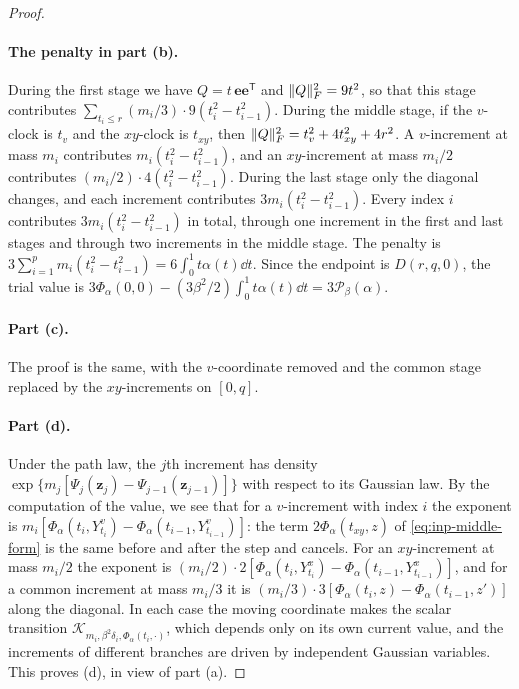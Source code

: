 \begin{proof}
\paragraph{The penalty in part (b).} During the first stage we have $Q=t\,\mathbf e\mathbf
e^{\mathsf T}$ and $\lVert Q\rVert_F^2=9t^2$, so that this stage contributes
$\sum_{t_i\le r}(m_i/3)\cdot9(t_i^2-t_{i-1}^2)$. During the middle stage, if
the $v$-clock is $t_v$ and the $xy$-clock is $t_{xy}$, then $\lVert Q\rVert_F^2=t_v^2+4t_{xy}^2+4r^2$.
A $v$-increment at mass $m_i$ contributes $m_i(t_i^2-t_{i-1}^2)$, and an
$xy$-increment at mass $m_i/2$ contributes $(m_i/2)\cdot4(t_i^2-t_{i-1}^2)$.
During the last stage only the diagonal changes, and each increment contributes
$3m_i(t_i^2-t_{i-1}^2)$. Every index $i$ contributes
$3m_i(t_i^2-t_{i-1}^2)$ in total, through one increment in the first and last
stages and through two increments in the middle stage. The penalty is
$3\sum_{i=1}^pm_i(t_i^2-t_{i-1}^2)=6\int_0^1t\alpha(t)\dd t$. Since the endpoint
is $D(r,q,0)$, the trial value is
$3\Phi_\alpha(0,0)-(3\beta^2/2)\int_0^1t\alpha(t)\dd t=3\mathcal P_\beta(\alpha)$.

\paragraph{Part (c).} The proof is the same, with the $v$-coordinate removed and
the common stage replaced by the $xy$-increments on $[0,q]$.

\paragraph{Part (d).} Under the path law, the $j$th increment has density
$\exp\{m_j[\Psi_j(\mathbf z_j)-\Psi_{j-1}(\mathbf z_{j-1})]\}$ with respect to its
Gaussian law. By the computation of the value, we see that for a $v$-increment with
index $i$ the exponent is $m_i[\Phi_\alpha(t_i,Y^v_{t_i})-\Phi_\alpha(t_{i-1},Y^v_{t_{i-1}})]$:
the term $2\Phi_\alpha(t_{xy},z)$ of \eqref{eq:inp-middle-form} is the same before and
after the step and cancels. For an $xy$-increment at mass $m_i/2$ the exponent is
$(m_i/2)\cdot2[\Phi_\alpha(t_i,Y^x_{t_i})-\Phi_\alpha(t_{i-1},Y^x_{t_{i-1}})]$,
and for a common increment at mass $m_i/3$ it is
$(m_i/3)\cdot3[\Phi_\alpha(t_i,z)-\Phi_\alpha(t_{i-1},z')]$ along the diagonal.
In each case the moving coordinate makes the scalar transition
$\mathcal K_{m_i,\beta^2\delta_i,\Phi_\alpha(t_i,\cdot)}$, which depends only on its own
current value, and the increments of different branches are driven by
independent Gaussian variables. This proves (d), in view of part (a).
\end{proof}

